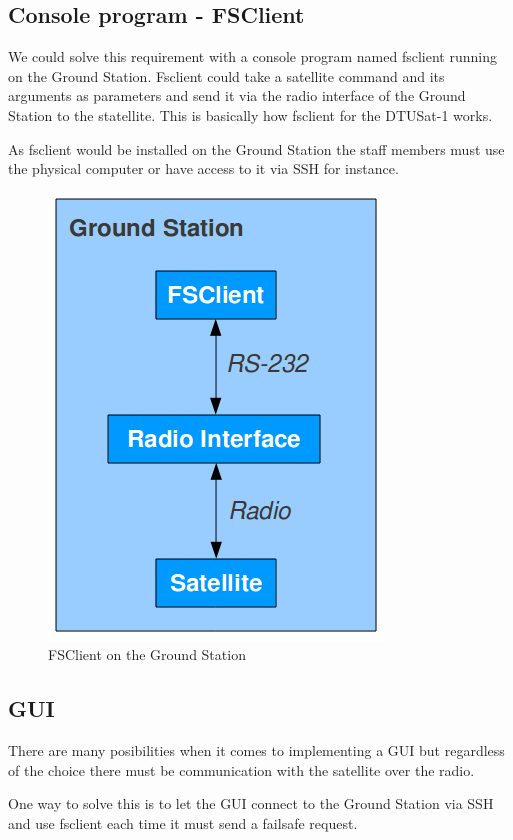 \subsection{Console program - FSClient}
We could solve this requirement with a console program named fsclient running on the Ground Station. Fsclient could take a satellite command and its arguments as parameters and send it via the radio interface of the Ground Station to the statellite. This is basically how fsclient for the DTUSat-1 works.

As fsclient would be installed on the Ground Station the staff members must use the physical computer or have access to it via SSH for instance.

\begin{figure}[h!] \centering
	\includegraphics[scale=0.5]{img/interaction_via_console}
  \caption{FSClient on the Ground Station}
\end{figure}

\subsection{GUI}
There are many posibilities when it comes to implementing a GUI but regardless of the choice there must be communication with the satellite over the radio.

One way to solve this is to let the GUI connect to the Ground Station via SSH and use fsclient each time it must send a failsafe request.

